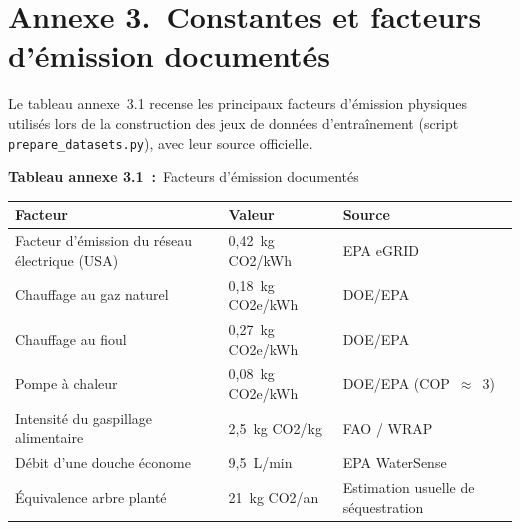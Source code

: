 \newpage
\section*{Annexe 3.~Constantes et facteurs d'émission documentés}


Le tableau annexe~3.1 recense les principaux facteurs d'émission physiques utilisés lors de la construction des jeux de données d'entraînement (script \texttt{prepare\_datasets.py}), avec leur source officielle.

{\raggedright \textbf{Tableau annexe 3.1~:}~Facteurs d'émission documentés}
\begin{longtable}[c]{
    | p{}
    | p{}
    | p{} |
}
    \hline
    \textbf{Facteur} & \textbf{Valeur} & \textbf{Source} \\ \hline
    \endhead
    Facteur d'émission du réseau électrique (USA) & 0,42~kg CO2/kWh & EPA eGRID \\ \hline
    Chauffage au gaz naturel & 0,18~kg CO2e/kWh & DOE/EPA \\ \hline
    Chauffage au fioul & 0,27~kg CO2e/kWh & DOE/EPA \\ \hline
    Pompe à chaleur & 0,08~kg CO2e/kWh & DOE/EPA (COP~$\approx$~3) \\ \hline
    Intensité du gaspillage alimentaire & 2,5~kg CO2/kg & FAO / WRAP \\ \hline
    Débit d'une douche économe & 9,5~L/min & EPA WaterSense \\ \hline
    Équivalence arbre planté & 21~kg CO2/an & Estimation usuelle de séquestration \\ \hline
\end{longtable}
